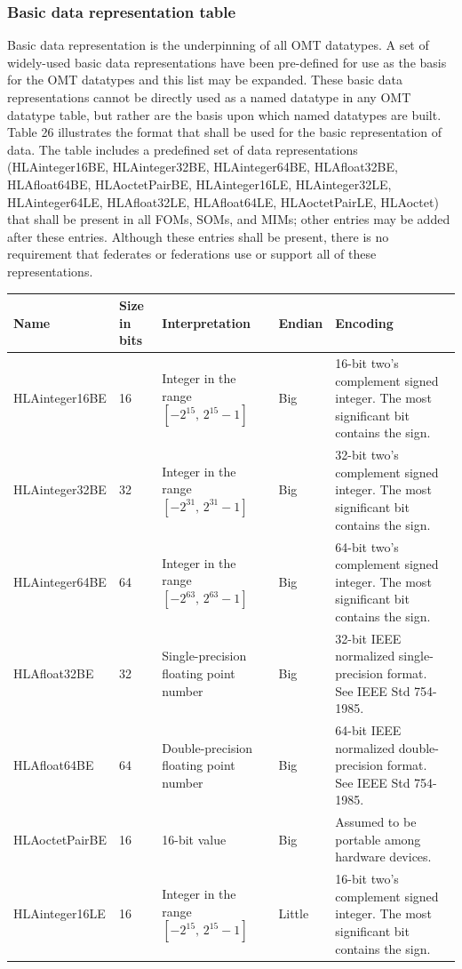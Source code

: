 \subsubsection{Basic data representation table}
Basic data representation is the underpinning of all OMT datatypes. A set of widely-used basic data representations have been pre-defined for use as the basis for the OMT datatypes and this list may be expanded. These basic data representations cannot be directly used as a named datatype in any OMT datatype table, but rather are the basis upon which named datatypes are built. Table 26 illustrates the format that shall be used for the basic representation of data. The table includes a predefined set of data representations (HLAinteger16BE, HLAinteger32BE, HLAinteger64BE, HLAfloat32BE, HLAfloat64BE, HLAoctetPairBE, HLAinteger16LE, HLAinteger32LE, HLAinteger64LE, HLAfloat32LE, HLAfloat64LE, HLAoctetPairLE, HLAoctet) that shall be present in all FOMs, SOMs, and MIMs; other entries may be added after these entries. Although these entries shall be present, there is no requirement that federates or federations use or support all of these representations.

\begingroup
\fontsize{8.0}{9.25}\selectfont
\setlength{\tabcolsep}{2.3pt}
\renewcommand{\arraystretch}{1.16}
\noindent\begin{tabularx}{\textwidth}{|L{88pt}|C{34pt}|L{112pt}|C{43pt}|Y|}
\hline
\centering\bfseries Name & \bfseries Size in bits & \centering\bfseries Interpretation & \bfseries Endian & \centering\arraybackslash\bfseries Encoding \\
\hline
HLAinteger16BE & 16 & Integer in the range $[-2^{15},\,2^{15}-1]$ & Big & 16-bit two's complement signed integer. The most significant bit contains the sign. \\
\hline
HLAinteger32BE & 32 & Integer in the range $[-2^{31},\,2^{31}-1]$ & Big & 32-bit two's complement signed integer. The most significant bit contains the sign. \\
\hline
HLAinteger64BE & 64 & Integer in the range $[-2^{63},\,2^{63}-1]$ & Big & 64-bit two's complement signed integer. The most significant bit contains the sign. \\
\hline
HLAfloat32BE & 32 & Single-precision floating point number & Big & 32-bit IEEE normalized single-precision format. See IEEE Std 754-1985. \\
\hline
HLAfloat64BE & 64 & Double-precision floating point number & Big & 64-bit IEEE normalized double-precision format. See IEEE Std 754-1985. \\
\hline
HLAoctetPairBE & 16 & 16-bit value & Big & Assumed to be portable among hardware devices. \\
\hline
HLAinteger16LE & 16 & Integer in the range $[-2^{15},\,2^{15}-1]$ & Little & 16-bit two's complement signed integer. The most significant bit contains the sign. \\
\hline
\end{tabularx}
\endgroup

